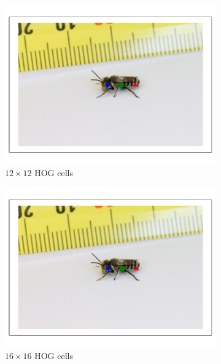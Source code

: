 \documentclass[11pt, oneside]{report}
\begin{document}
\begin{figure}[p]
\begin{subfigure}[b]{0.3\textwidth}
                \includegraphics[width=\textwidth]{hog12_3.pdf}
                \caption{$12\times12$ HOG cells}
            \end{subfigure}
            \begin{subfigure}[b]{0.3\textwidth}
                \centering
                \includegraphics[width=\textwidth]{hog16_3.pdf}
                \caption{$16\times16$ HOG cells}
            \end{subfigure}
            \begin{subfigure}[b]{0.3\textwidth}
                \centering

\end{subfigure}
\end{figure}
\end{document}
